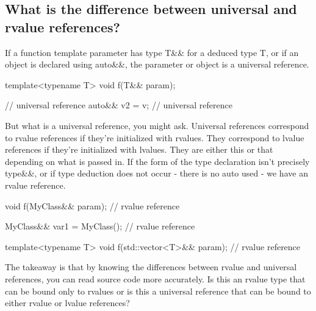 \documentclass{report}
\begin{document}
 \bigbreak \noindent 
 \subsection{What is the difference between universal and rvalue references?}
 \bigbreak \noindent 
 If a function template parameter has type T\&\& for a deduced type T, or if an object is declared using auto\&\&, the parameter or object is a universal reference.
 \bigbreak \noindent 
 \begin{cppcode}
     template<typename T>
     void f(T&& param);

     // universal reference
     auto&& v2 = v; // universal reference
 \end{cppcode}
 \bigbreak \noindent 
 But what is a universal reference, you might ask. Universal references correspond to rvalue references if they’re initialized with rvalues. They correspond to lvalue references if they’re initialized with lvalues. They are either this or that depending on what is passed in.
 \bigbreak \noindent 
 If the form of the type declaration isn’t precisely type\&\&, or if type deduction does not occur - there is no auto used - we have an rvalue reference.
 \bigbreak \noindent 
 \begin{cppcode}
     void f(MyClass&& param); // rvalue reference

     MyClass&& var1 = MyClass(); // rvalue reference

     template<typename T>
     void f(std::vector<T>&& param); // rvalue reference
 \end{cppcode}
 \bigbreak \noindent 
 The takeaway is that by knowing the differences between rvalue
and universal references, you can read source code more accurately.
Is this an rvalue type that can be bound only to rvalues or is this
a universal reference that can be bound to either rvalue or lvalue
references?

\bigbreak \noindent 
\end{document}
